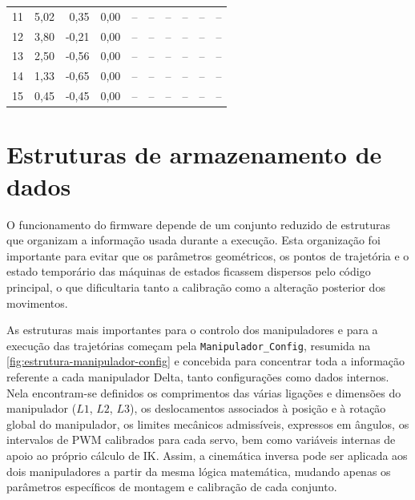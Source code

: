 \begin{table}[H]
{\begin{tabular}{c rrr rrr rrr}
    \rowcolor{gray!8}
    11 & 5,02 & 0,35  & 0,00 & --    & --   & --    & --    & --    & --\\
    12 & 3,80 & -0,21 & 0,00 & --    & --   & --    & --    & --    & --\\
    \rowcolor{gray!8}
    13 & 2,50 & -0,56 & 0,00 & --    & --   & --    & --    & --    & --\\
    14 & 1,33 & -0,65 & 0,00 & --    & --   & --    & --    & --    & --\\
    \rowcolor{gray!8}
    15 & 0,45 & -0,45 & 0,00 & --    & --   & --    & --    & --    & --\\
    \bottomrule
  \end{tabular}}
\end{table}

\section{Estruturas de armazenamento de dados}
O funcionamento do firmware depende de um conjunto reduzido de estruturas que organizam a informação usada durante a execução. Esta organização foi importante para evitar que os parâmetros geométricos, os pontos de trajetória e o estado temporário das máquinas de estados ficassem dispersos pelo código principal, o que dificultaria tanto a calibração como a alteração posterior dos movimentos.

As estruturas mais importantes para o controlo dos manipuladores e para a execução das trajetórias começam pela \texttt{Manipulador\_Config}, resumida na \cref{fig:estrutura-manipulador-config} e concebida para concentrar toda a informação referente a cada manipulador Delta, tanto configurações como dados internos. Nela encontram-se definidos os comprimentos das várias ligações e dimensões do manipulador (\(L1\), \(L2\), \(L3\)), os deslocamentos associados à posição e à rotação global do manipulador, os limites mecânicos admissíveis, expressos em ângulos, os intervalos de PWM calibrados para cada servo, bem como variáveis internas de apoio ao próprio cálculo de IK. Assim, a cinemática inversa pode ser aplicada aos dois manipuladores a partir da mesma lógica matemática, mudando apenas os parâmetros específicos de montagem e calibração de cada conjunto.

